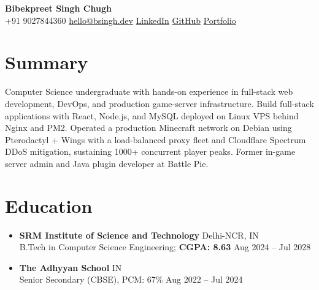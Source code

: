 \documentclass[11pt,letterpaper]{article}
\begin{document}
\begin{center}
{\LARGE\textbf{Bibekpreet Singh Chugh}}\\[4pt]
+91 9027844360 \textbar{} \href{mailto:hello@bsingh.dev}{hello@bsingh.dev} \textbar{} \href{https://www.linkedin.com/in/bibekpreet-singh-chugh-0b3a96325/}{LinkedIn} \textbar{} \href{https://github.com/BSinghOP}{GitHub} \textbar{} \href{https://bsingh.dev}{Portfolio}
\end{center}

\section*{Summary}
Computer Science undergraduate with hands-on experience in full-stack web development, DevOps, and production game-server infrastructure. Build full-stack applications with React, Node.js, and MySQL deployed on Linux VPS behind Nginx and PM2. Operated a production Minecraft network on Debian using Pterodactyl + Wings with a load-balanced proxy fleet and Cloudflare Spectrum DDoS mitigation, sustaining 1000+ concurrent player peaks. Former in-game server admin and Java plugin developer at Battle Pie.

\section*{Education}
\begin{itemize}
\item \textbf{SRM Institute of Science and Technology} \hfill Delhi-NCR, IN \\
B.Tech in Computer Science Engineering; \textbf{CGPA: 8.63} \hfill Aug 2024 -- Jul 2028
\item \textbf{The Adhyyan School} \hfill IN \\
Senior Secondary (CBSE), PCM: 67\% \hfill Aug 2022 -- Jul 2024
\end{itemize}
\end{document}
